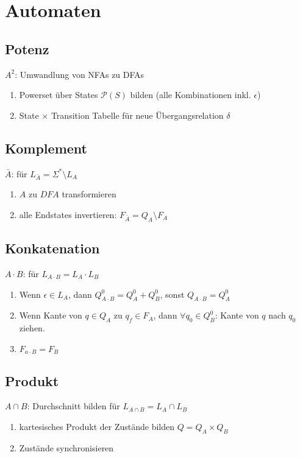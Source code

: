 \documentclass{summary}
\author{Leopold Lemmermann}
\begin{document}
\createtitle

\section{Automaten}
\subsection{Potenz}
$A^2$: Umwandlung von NFAs zu DFAs

\begin{enumerate}
  \item Powerset über States $\mathcal{P}(S)$ bilden (alle Kombinationen inkl. $\epsilon$)
  \item State $\times$ Transition Tabelle für neue Übergangsrelation $\delta$
\end{enumerate}

\subsection{Komplement}
$\bar{A}$: für $L_{\bar{A}} =\Sigma^* \setminus L_A$

\begin{enumerate}
  \item $A$ zu $DFA$ transformieren
  \item alle Endstates invertieren: $F_{\bar{A}}=Q_A\setminus F_A$
\end{enumerate}

\subsection{Konkatenation}
$A\cdot B$: für $L_{A\cdot B}=L_A\cdot L_B$

\begin{enumerate}
  \item Wenn $\epsilon\in L_A$, dann $Q_{A\cdot B}^0=Q_A^0+Q_B^0$, sonst $Q_{A\cdot B}=Q_A^0$
  \item Wenn Kante von $q\in Q_A$ zu $q_f\in F_A$, dann $\forall q_0\in Q_B^0$: Kante von $q$ nach $q_0$ ziehen.
  \item $F_{a\cdot B}=F_B$
\end{enumerate}

\subsection{Produkt}
$A\cap B$: Durchschnitt bilden für $L_{A\cap B}=L_A\cap L_B$

\begin{enumerate}
  \item kartesisches Produkt der Zustände bilden $Q=Q_A\times Q_B$
  \item Zustände synchronisieren
\end{enumerate}
\end{document}

